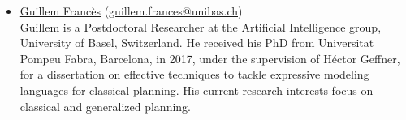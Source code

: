\documentclass[10pt]{article}
\begin{document}
\begin{itemize}

\item \href{https://ai.dmi.unibas.ch/people/frances}{Guillem Franc\`{e}s}
    (\href{mailto:guillem.frances@unibas.ch}{guillem.frances@unibas.ch})\\
Guillem is a Postdoctoral Researcher at the Artificial Intelligence group, University of Basel, Switzerland.
He received his PhD from Universitat Pompeu Fabra, Barcelona, in 2017, under the supervision of H\'{e}ctor Geffner,
for a dissertation on effective techniques to tackle expressive modeling languages for classical planning.
His current research interests focus on classical and generalized planning.





%




\end{itemize}
\end{document}

